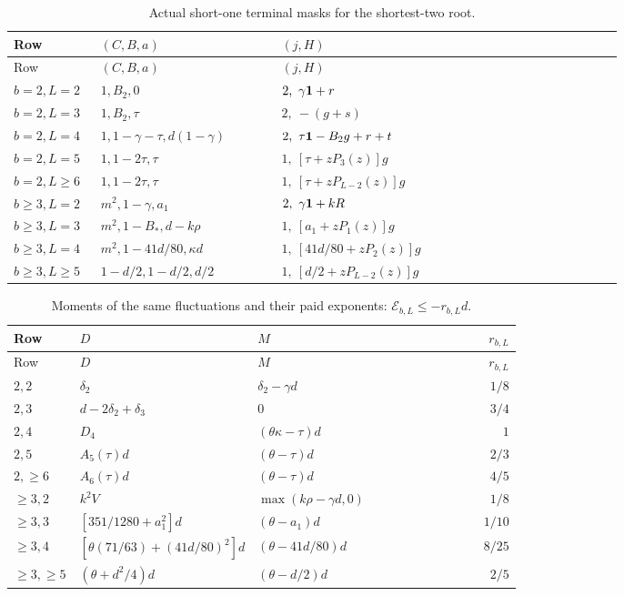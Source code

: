 \begingroup\small
\setlength{\tabcolsep}{3pt}
\setlength{\LTleft}{0pt}\setlength{\LTright}{\fill}
\begin{longtable}{@{}p{0.13\linewidth}p{0.27\linewidth}p{0.51\linewidth}@{}}
\caption{Actual short-one terminal masks for the shortest-two root.}
\label{tab:short2:actual-masks}\\
\toprule Row&\((C,B,a)\)&\((j,H)\)\\\midrule\endfirsthead
\toprule Row&\((C,B,a)\)&\((j,H)\)\\\midrule\endhead
\bottomrule\endfoot
\(b=2,L=2\)&\(1,B_2,0\)&\(2,\ \gamma\one+r\)\\
\(b=2,L=3\)&\(1,B_2,\tau\)&\(2,\ -(g+s)\)\\
\(b=2,L=4\)&\(1,1-\gamma-\tau,d(1-\gamma)\)&
 \(2,\ \tau\one-B_2g+r+t\)\\
\(b=2,L=5\)&\(1,1-2\tau,\tau\)&\(1,\ [\tau+zP_3(z)]g\)\\
\(b=2,L\ge6\)&\(1,1-2\tau,\tau\)&\(1,\ [\tau+zP_{L-2}(z)]g\)\\
\(b\ge3,L=2\)&\(m^2,1-\gamma,a_1\)&\(2,\ \gamma\one+kR\)\\
\(b\ge3,L=3\)&\(m^2,1-B_*,d-k\rho\)&
 \(1,\ [a_1+zP_1(z)]g\)\\
\(b\ge3,L=4\)&\(m^2,1-41d/80,\kappa d\)&
 \(1,\ [41d/80+zP_2(z)]g\)\\
\(b\ge3,L\ge5\)&\(1-d/2,1-d/2,d/2\)&
 \(1,\ [d/2+zP_{L-2}(z)]g\)\\
\end{longtable}
\endgroup

\begingroup\small
\setlength{\tabcolsep}{3pt}
\setlength{\LTleft}{0pt}\setlength{\LTright}{\fill}
\begin{longtable}{@{}p{0.13\linewidth}p{0.35\linewidth}p{0.29\linewidth}r@{}}
\caption{Moments of the same fluctuations and their paid exponents:
\(\mathcal E_{b,L}\le-r_{b,L}d\).}
\label{tab:short2:payments}\\
\toprule Row&\(D\)&\(M\)&\(r_{b,L}\)\\\midrule\endfirsthead
\toprule Row&\(D\)&\(M\)&\(r_{b,L}\)\\\midrule\endhead
\bottomrule\endfoot
\(2,2\)&\(\delta_2\)&\(\delta_2-\gamma d\)&\(1/8\)\\
\(2,3\)&\(d-2\delta_2+\delta_3\)&\(0\)&\(3/4\)\\
\(2,4\)&\(D_4\)&\((\theta\kappa-\tau)d\)&\(1\)\\
\(2,5\)&\(A_5(\tau)d\)&\((\theta-\tau)d\)&\(2/3\)\\
\(2,\ge6\)&\(A_6(\tau)d\)&\((\theta-\tau)d\)&\(4/5\)\\
\(\ge3,2\)&\(k^2V\)&\(\max(k\rho-\gamma d,0)\)&\(1/8\)\\
\(\ge3,3\)&\([351/1280+a_1^2]d\)&\((\theta-a_1)d\)&\(1/10\)\\
\(\ge3,4\)&\([\theta(71/63)+(41d/80)^2]d\)&
 \((\theta-41d/80)d\)&\(8/25\)\\
\(\ge3,\ge5\)&\((\theta+d^2/4)d\)&\((\theta-d/2)d\)&\(2/5\)\\
\end{longtable}
\endgroup


